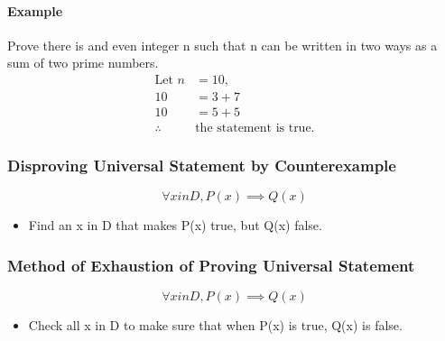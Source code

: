 \paragraph*{Example}
Prove there is and even integer n such that n can be written in two ways as a sum of two prime numbers.
\begin{align*}
    \text{Let } n &= 10,\\
    10 &= 3 + 7\\
    10 &= 5+5\\
    \therefore \quad &\text{the statement is true.}
\end{align*}

\subsubsection*{Disproving Universal Statement by Counterexample}
\begin{equation*}
    \forall x in D, P(x) \implies Q(x)
\end{equation*}

\begin{itemize}
    \item Find an x in D that makes P(x) true, but Q(x) false.
\end{itemize}


\subsubsection*{Method of Exhaustion of Proving Universal Statement}
\begin{equation*}
    \forall x in D, P(x) \implies Q(x)
\end{equation*}
\begin{itemize}
    \item Check all x in D to make sure that when P(x) is true, Q(x) is false.
\end{itemize}



